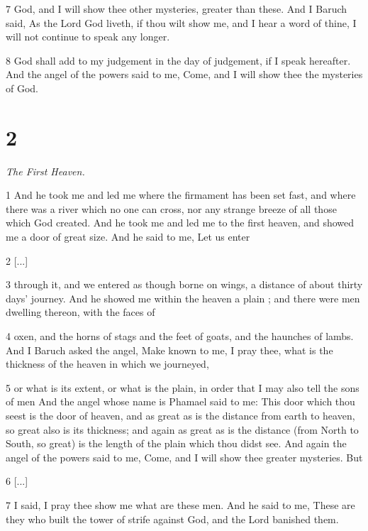 \par 7 God, and I will show thee other mysteries, greater than these. And I Baruch said, As the Lord God liveth, if thou wilt show me, and I hear a word of thine, I will not continue to speak any longer.

\par 8 God shall add to my judgement in the day of judgement, if I speak hereafter. And the angel of the powers said to me, Come, and I will show thee the mysteries of God.

\chapter{2}

\par \textit{The First Heaven.}

\par 1 And he took me and led me where the firmament has been set fast, and where there was a river which no one can cross, nor any strange breeze of all those which God created. And he took me and led me to the first heaven, and showed me a door of great size. And he said to me, Let us enter

\par 2 [...]

\par 3 through it, and we entered as though borne on wings, a distance of about thirty days' journey. And he showed me within the heaven a plain ; and there were men dwelling thereon, with the faces of

\par 4 oxen, and the horns of stags and the feet of goats, and the haunches of lambs. And I Baruch asked the angel, Make known to me, I pray thee, what is the thickness of the heaven in which we journeyed,

\par 5 or what is its extent, or what is the plain, in order that I may also tell the sons of men And the angel whose name is Phamael said to me: This door which thou seest is the door of heaven, and as great as is the distance from earth to heaven, so great also is its thickness; and again as great as is the distance (from North to South, so great) is the length of the plain which thou didst see. And again the angel of the powers said to me, Come, and I will show thee greater mysteries. But 

\par 6 [...]

\par 7  I said, I pray thee show me what are these men. And he said to me, These are they who built the tower of strife against God, and the Lord banished them.

